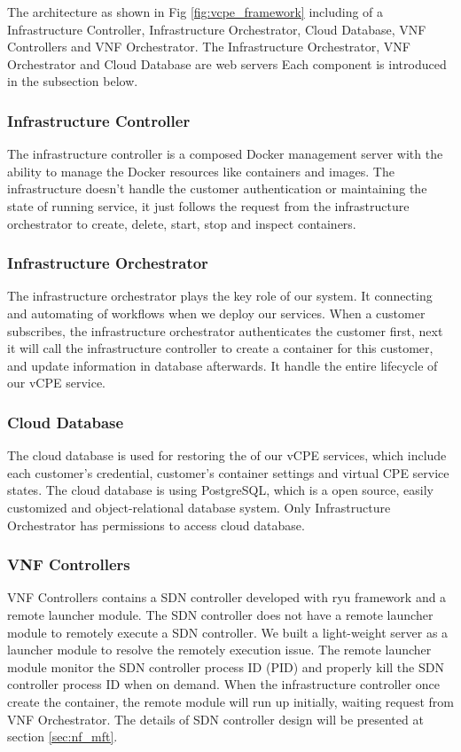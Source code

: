 \documentclass[journal]{IEEEtran}
\begin{document}
The architecture as shown in Fig \ref{fig:vcpe_framework} including of a Infrastructure Controller,
Infrastructure Orchestrator, Cloud Database, VNF Controllers and VNF Orchestrator.
The Infrastructure Orchestrator, VNF Orchestrator and Cloud Database are web servers
Each component is introduced in the subsection below.

\subsubsection{Infrastructure Controller}
The infrastructure controller is a composed Docker management server
with the ability to manage the Docker resources like containers and images.
The infrastructure doesn't handle the customer authentication or maintaining the state of running service,
it just follows the request from the infrastructure orchestrator to create, delete, start, stop and inspect containers.

\subsubsection{Infrastructure Orchestrator}
The infrastructure orchestrator plays the key role of our system.
It connecting and automating of workflows when we deploy our services.
When a customer subscribes, the infrastructure orchestrator authenticates the customer first,
next it will call the infrastructure controller to create a container for this customer,
and update information in database afterwards. It handle the entire lifecycle of our vCPE service.

\subsubsection{Cloud Database}
The cloud database is used for restoring the of our vCPE services,
which include each customer’s credential, customer’s container settings and virtual CPE service states.
The cloud database is using PostgreSQL, which is a open source, easily customized and object-relational database system.
Only Infrastructure Orchestrator has permissions to access cloud database.

\subsubsection{VNF Controllers}
VNF Controllers contains a SDN controller developed with ryu framework and a remote launcher module.
The SDN controller does not have a remote launcher module to remotely execute a SDN controller.
We built a light-weight server as a launcher module to resolve the remotely execution issue.
The remote launcher module monitor the SDN controller process ID (PID)
and properly kill the SDN controller process ID when on demand.
When the infrastructure controller once create the container, the remote module will run up initially, waiting request  from VNF Orchestrator. The details of SDN controller design will be presented at section \ref{sec:nf_mft}.
\end{document}
